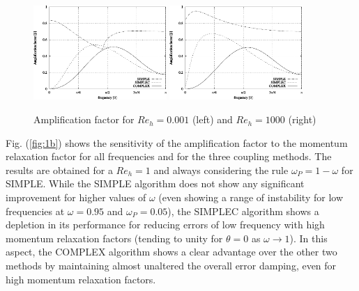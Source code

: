 \documentclass[final,3p,times,10pt,onecolumn]{myElsarticle}
\numberwithin{equation}{section}
\begin{document}
\begin{figure}[H]
    \centering
    \includegraphics[width=0.45\textwidth]{fig/Re0001} \hspace{1cm}
    \includegraphics[width=0.45\textwidth]{fig/Re1000}
    \caption{Amplification factor for $Re_h=0.001$ (left) and $Re_h=1000$ (right)}
    \label{fig:1a}
\end{figure}
    
Fig. (\ref{fig:1b}) shows the sensitivity of the amplification factor to the momentum relaxation factor for all frequencies and for the three coupling methods. The results are obtained for a $Re_h=1$ and always considering the rule $\omega_P = 1 - \omega$ for SIMPLE. While the SIMPLE algorithm does not show any significant improvement for higher values of $\omega$ (even showing a range of instability for low frequencies at $\omega=0.95$ and $\omega_P=0.05$), the SIMPLEC algorithm shows a depletion in its performance for reducing errors of low frequency with high momentum relaxation factors (tending to unity for $\theta=0$ as $\omega \rightarrow 1$). In this aspect, the COMPLEX algorithm shows a clear advantage over the other two methods by maintaining almost unaltered the overall error damping, even for high momentum relaxation factors.     
    
\end{document}
